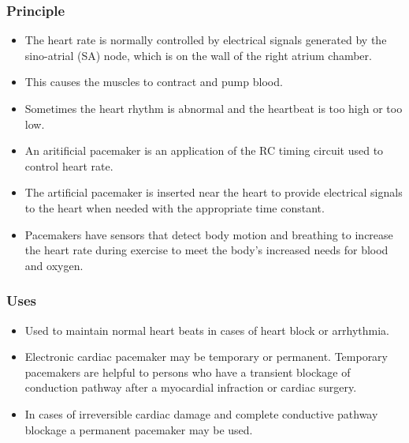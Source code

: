 \documentclass[12pt]{book}
\begin{document}
\subsubsection{Principle}
\begin{itemize}


\item The heart rate is normally controlled by electrical signals generated by the sino-atrial (SA) node, which is on the wall of the right atrium chamber.
\item This causes the muscles to contract and pump blood.
\item Sometimes the heart rhythm is abnormal and the heartbeat is too high or too low.

\item An aritificial pacemaker is an application of the RC timing circuit used to control heart rate.

\item The artificial pacemaker is inserted near the heart to provide electrical signals to the heart when needed with the appropriate time constant.

\item Pacemakers have sensors that detect body motion and breathing to increase the heart rate during exercise to meet the body’s increased needs for blood and oxygen.
\end{itemize}
\subsubsection{Uses}
\begin{itemize}
	\item Used to maintain normal heart beats in cases of heart block or arrhythmia.
	\item Electronic cardiac pacemaker may be temporary or permanent.
Temporary pacemakers are helpful to persons who have a transient
blockage of conduction pathway after a myocardial infraction or
cardiac surgery.
\item In cases of irreversible cardiac damage and complete conductive
pathway blockage a permanent pacemaker may be used.
\end{itemize}
\end{document}
